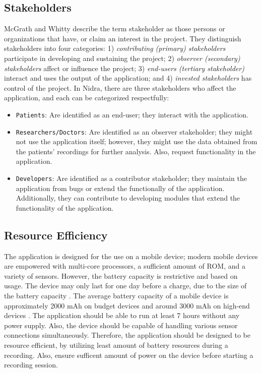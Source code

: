 \subsection{Stakeholders}
McGrath and Whitty \cite{stakeholderdefined} describe the term stakeholder as those persons or organizations that have, or claim an interest in the project. They distinguish stakeholders into four categories: 1) \textit{contributing (primary) stakeholders} participate in developing and sustaining the project; 2) \textit{observer (secondary) stakeholders} affect or influence the project;  3) \textit{end-users (tertiary stakeholder)} interact and uses the output of the application; and 4) \textit{invested stakeholders} has control of the project. In Nidra, there are three stakeholders who affect the application, and each can be categorized respectfully:
\begin{itemize}
    \item \verb|Patients|: Are identified as an end-user; they interact with the application.  
    \item \verb|Researchers/Doctors|: Are identified as an observer stakeholder; they might not use the application itself; however, they might use the data obtained from the patients' recordings for further analysis. Also, request functionality in the application.
    \item \verb|Developers|: Are identified as a contributor stakeholder; they maintain the application from bugs or extend the functionally of the application. Additionally, they can contribute to developing modules that extend the functionality of the application. 
\end{itemize}

\subsection{Resource Efficiency}
The application is designed for the use on a mobile device; modern mobile devices are empowered with multi-core processors, a sufficient amount of ROM, and a variety of sensors. However, the battery capacity is restrictive and based on usage. The device may only last for one day before a charge, due to the size of the battery capacity \cite{androidbattery}. The average battery capacity of a mobile device is approximately 2000 mAh on budget devices and around 3000 mAh on high-end devices \cite{androidbatteryavg}. The application should be able to run at least 7 hours without any power supply. Also, the device should be capable of handling various sensor connections simultaneously. Therefore, the application should be designed to be resource efficient, by utilizing least amount of battery resources during a recording. Also, ensure sufficent amount of power on the device before starting a recording session.  

